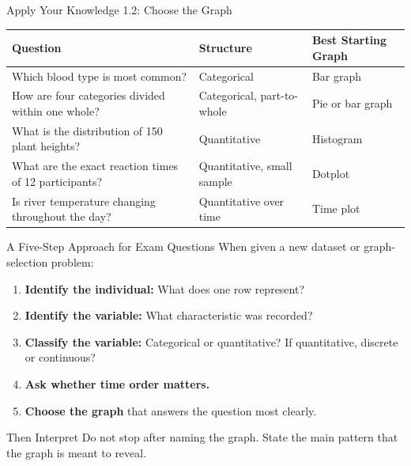 \documentclass[aspectratio=169]{beamer}
\begin{document}
\begin{frame}{Apply Your Knowledge 1.2: Choose the Graph}
  \begin{table}
    \centering
    \small
    \begin{tabularx}{\textwidth}{X X l}
      \toprule
      \textbf{Question} & \textbf{Structure} & \textbf{Best Starting Graph} \\
      \midrule
      Which blood type is most common? & Categorical & Bar graph \\
      How are four categories divided within one whole? & Categorical, part-to-whole & Pie or bar graph \\
      What is the distribution of 150 plant heights? & Quantitative & Histogram \\
      What are the exact reaction times of 12 participants? & Quantitative, small sample & Dotplot \\
      Is river temperature changing throughout the day? & Quantitative over time & Time plot \\
      \bottomrule
    \end{tabularx}
  \end{table}
\end{frame}

\begin{frame}{A Five-Step Approach for Exam Questions}
  When given a new dataset or graph-selection problem:
  \begin{enumerate}
    \item \textbf{Identify the individual:} What does one row represent?
    \item \textbf{Identify the variable:} What characteristic was recorded?
    \item \textbf{Classify the variable:} Categorical or quantitative? If quantitative, discrete or continuous?
    \item \textbf{Ask whether time order matters.}
    \item \textbf{Choose the graph} that answers the question most clearly.
  \end{enumerate}
  \vspace{0.2cm}
  \begin{alertblock}{Then Interpret}
    Do not stop after naming the graph. State the main pattern that the graph is meant to reveal.
  \end{alertblock}
\end{frame}
\end{document}
